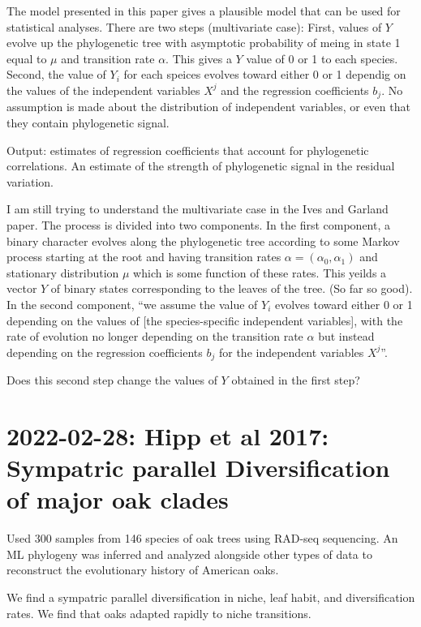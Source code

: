 \documentclass{article}
\begin{document}
The model presented in this paper gives a plausible model that can be used for
statistical analyses. There are two steps (multivariate case): First, values of
$Y$ evolve up the phylogenetic tree with asymptotic probability of meing in
state 1 equal to $\mu$ and transition rate $\alpha$. This gives a $Y$ value of 0
or 1 to each species. Second, the value of $Y_{i}$ for each speices evolves
toward either 0 or 1 dependig on the values of the independent variables $X^{j}$
and the regression coefficients $b_{j}$. No assumption is made about the
distribution of independent variables, or even that they contain phylogenetic
signal.

Output: estimates of regression coefficients that account for phylogenetic
correlations. An estimate of the strength of phylogenetic signal in the residual
variation.


I am still trying to understand the multivariate case in the Ives and Garland
paper. The process is divided into two components. In the first component, a
binary character evolves along the phylogenetic tree according to some Markov
process starting at the root and having transition rates
$\alpha=(\alpha_{0},\alpha_{1})$ and stationary distribution $\mu$ which is some
function of these rates. This yeilds a vector $Y$ of binary states corresponding
to the leaves of the tree. (So far so good). In the second component, ``we
assume the value of $Y_{i}$ evolves toward either 0 or 1 depending on the values
of [the species-specific independent variables], with the rate of evolution no
longer depending on the transition rate $\alpha$ but instead depending on the
regression coefficients $b_{j}$ for the independent variables $X^{j}$''.

Does this second step change the values of $Y$ obtained in the first step?

\section{2022-02-28: Hipp et al 2017: Sympatric parallel Diversification of
  major oak clades}

Used 300 samples from 146 species of oak trees using RAD-seq sequencing. An ML
phylogeny was inferred and analyzed alongside other types of data to reconstruct
the evolutionary history of American oaks.

We find a sympatric parallel diversification in niche, leaf habit, and
diversification rates. We find that oaks adapted rapidly to niche transitions.
\end{document}
